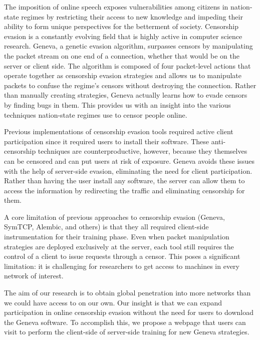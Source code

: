 
The imposition of online speech exposes vulnerabilities among citizens in nation-state regimes by restricting their access to new knowledge and impeding their ability to form unique perspectives for the betterment of society. Censorship evasion is a constantly evolving field that is highly active in computer science research. Geneva, a genetic evasion algorithm, surpasses censors by manipulating the packet stream on one end of a connection, whether that would be on the server or client side. The algorithm is composed of four packet-level actions that operate together as censorship evasion strategies and allows us to manipulate packets to confuse the regime’s censors without destroying the connection. Rather than manually creating strategies, Geneva actually learns how to evade censors by finding bugs in them. This provides us with an insight into the various techniques nation-state regimes use to censor people online.

Previous implementations of censorship evasion tools required active client participation since it required users to install their software. These anti-censorship techniques are counterproductive, however, because they themselves can be censored and can put users at risk of exposure. Geneva avoids these issues with the help of server-side evasion, eliminating the need for client participation. Rather than having the user install any software, the server can allow them to access the information by redirecting the traffic and eliminating censorship for them.

A core limitation of previous approaches to censorship evasion (Geneva, SymTCP, Alembic, and others) is that they all required client-side instrumentation for their training phase. Even when packet manipulation strategies are deployed exclusively at the server, each tool still requires the control of a client to issue requests through a censor. This poses a significant limitation: it is challenging for researchers to get access to machines in every network of interest. 

The aim of our research is to obtain global penetration into more networks than we could have access to on our own. Our insight is that we can expand participation in online censorship evasion without the need for users to download the Geneva software. To accomplish this, we propose a webpage that users can visit to perform the client-side of server-side training for new Geneva strategies.

